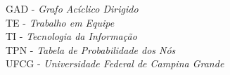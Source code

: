 GAD     - \textit{Grafo Acíclico Dirigido}\\
TE      - \textit{Trabalho em Equipe}\\
TI      - \textit{Tecnologia da Informação}\\
TPN     - \textit{Tabela de Probabilidade dos Nós}\\
UFCG	- \textit{Universidade Federal de Campina Grande}
